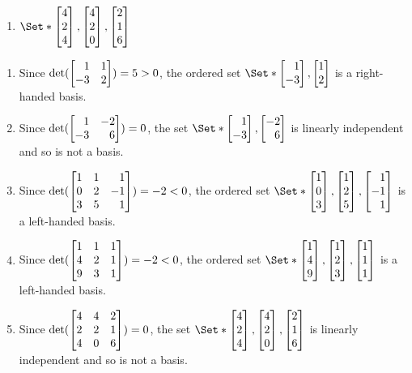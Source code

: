 \begin{exercises}
\begin{problist}
\begin{enumerate}
			\item $\Set*{\mat{4 \\ 2 \\ 4},\mat{4 \\ 2 \\ 0},\mat{2 \\ 1 \\ 6}}$
		\end{enumerate}
        \begin{solution}
        \begin{enumerate}
          \item Since $\det(\mat{1 & 1 \\ -3 & 2})=5>0$, the ordered set $\Set*{\mat{1 \\ -3},\mat{1 \\ 2}}$ is a right-handed basis.
          \item Since $\det(\mat{1 & -2 \\ -3 & 6})=0$, the set $\Set*{\mat{1 \\ -3},\mat{-2 \\ 6}}$ is linearly independent and so is not a basis.
          \item Since $\det(\mat{1 & 1 & 1 \\ 0 & 2 & -1 \\ 3 & 5 & 1})=-2<0$, the ordered set $\Set*{\mat{1 \\ 0 \\ 3},\mat{1 \\ 2 \\ 5},\mat{1 \\ -1 \\ 1}}$ is a left-handed basis.
          \item Since $\det(\mat{1 & 1 & 1 \\ 4 & 2 & 1 \\ 9 & 3 & 1})=-2<0$, the ordered set $\Set*{\mat{1 \\ 4 \\ 9},\mat{1 \\ 2 \\ 3},\mat{1 \\ 1 \\ 1}}$ is a left-handed basis.
          \item Since $\det(\mat{4 & 4 & 2 \\ 2 & 2 & 1 \\ 4 & 0 & 6})=0$, the set $\Set*{\mat{4 \\ 2 \\ 4},\mat{4 \\ 2 \\ 0},\mat{2 \\ 1 \\ 6}}$ is linearly independent and so is not a basis.
        \end{enumerate}
        \end{solution}


\end{problist}
\end{exercises}
